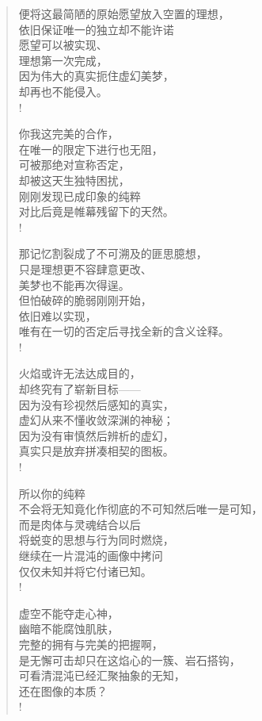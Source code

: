 \documentclass[UTF8, 12pt, a4paper]{ctexrep} %
\begin{document}
\begin{verse}
    便将这最简陋的原始愿望放入空置的理想，\\
    依旧保证唯一的独立却不能许诺\\
    愿望可以被实现、\\
    理想第一次完成，\\
    因为伟大的真实扼住虚幻美梦，\\
    却再也不能侵入。\\!

    你我这完美的合作，\\
    在唯一的限定下进行也无阻，\\
    可被那绝对宣称否定，\\
    却被这天生独特困扰，\\
    刚刚发现已成印象的纯粹\\
    对比后竟是帷幕残留下的天然。\\!

    那记忆割裂成了不可溯及的匪思臆想，\\
    只是理想更不容肆意更改、\\
    美梦也不能再次得逞。\\
    但怕破碎的脆弱刚刚开始，\\
    依旧难以实现，\\
    唯有在一切的否定后寻找全新的含义诠释。\\!

    火焰或许无法达成目的，\\
    却终究有了崭新目标——\\
    因为没有珍视然后感知的真实，\\
    虚幻从来不懂收敛深渊的神秘；\\
    因为没有审慎然后辨析的虚幻，\\
    真实只是放弃拼凑相契的图板。\\!

    所以你的纯粹\\
    不会将无知竟化作彻底的不可知然后唯一是可知，\\
    而是肉体与灵魂结合以后\\
    将蜕变的思想与行为同时燃烧，\\
    继续在一片混沌的画像中拷问\\
    仅仅未知并将它付诸已知。\\!

    虚空不能夺走心神，\\
    幽暗不能腐蚀肌肤，\\
    完整的拥有与完美的把握啊，\\
    是无懈可击却只在这焰心的一簇、岩石搭钩，\\
    可看清混沌已经汇聚抽象的无知，\\
    还在图像的本质？\\!


\end{verse}
\end{document}
